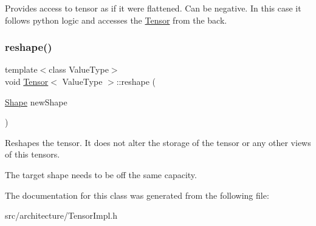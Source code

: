 Provides access to tensor as if it were flattened. Can be negative. In this case it follows python logic and accesses the \hyperlink{classTensor}{Tensor} from the back. 

\mbox{\label{classTensor_a83a18e08d96aed4132f615b6c63b3333}} 
\subsubsection{\texorpdfstring{reshape()}{reshape()}}
{\footnotesize\ttfamily template$<$class Value\+Type$>$ \\
void \hyperlink{classTensor}{Tensor}$<$ Value\+Type $>$\+::reshape (\begin{DoxyParamCaption}\item[{\hyperlink{classShape}{Shape}}]{new\+Shape }\end{DoxyParamCaption})\hspace{0.3cm}{\ttfamily [inline]}}

Reshapes the tensor. It does not alter the storage of the tensor or any other views of this tensors.

The target shape needs to be off the same capacity. 

The documentation for this class was generated from the following file\+:\begin{DoxyCompactItemize}
\item 
src/architecture/Tensor\+Impl.\+h\end{DoxyCompactItemize}
